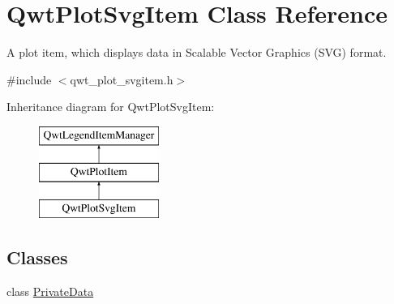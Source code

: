 \hypertarget{class_qwt_plot_svg_item}{\section{Qwt\-Plot\-Svg\-Item Class Reference}
\label{class_qwt_plot_svg_item}
}


A plot item, which displays data in Scalable Vector Graphics (S\-V\-G) format.  




{\ttfamily \#include $<$qwt\-\_\-plot\-\_\-svgitem.\-h$>$}

Inheritance diagram for Qwt\-Plot\-Svg\-Item\-:\begin{figure}[H]
\begin{center}
\leavevmode
\includegraphics[height=3.000000cm]{class_qwt_plot_svg_item}
\end{center}
\end{figure}
\subsection*{Classes}
\begin{DoxyCompactItemize}
\item 
class \hyperlink{class_qwt_plot_svg_item_1_1_private_data}{Private\-Data}
\end{DoxyCompactItemize}
